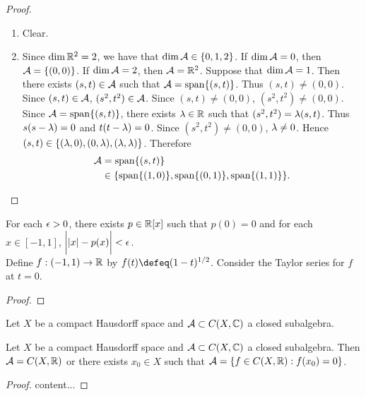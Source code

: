 \documentclass{book}
\begin{document}
\begin{proof}\
	\begin{enumerate}
		\item Clear.
		\item Since $\dim \mathbb{R}^2 = 2$, we have that $\dim \mathcal{A} \in \{0, 1, 2\}$. If $\dim \mathcal{A} = 0$, then $\mathcal{A} = \{(0,0)\}$. If $\dim \mathcal{A} = 2$, then $\mathcal{A} = \mathbb{R}^2$. Suppose that $\dim \mathcal{A} = 1$. Then there exists $(s,t) \in \mathcal{A}$ such that $\mathcal{A} = \operatorname{span} \{(s,t)\}$. Thus $(s,t) \neq (0,0)$. Since $(s,t) \in \mathcal{A}$, $(s^2, t^2) \in \mathcal{A}$. Since $(s,t) \neq (0,0)$, $(s^2, t^2) \neq (0,0)$. Since $\mathcal{A} = \operatorname{span} \{(s,t)\}$, there exists $\lambda \in \mathbb{R}$ such that $(s^2, t^2) = \lambda (s,t)$. Thus $s(s - \lambda) = 0$ and $t(t - \lambda) = 0$. Since $(s^2, t^2) \neq (0,0)$, $\lambda \neq 0$. Hence $(s,t) \in \{(\lambda, 0), (0, \lambda), (\lambda, \lambda)\}$. Therefore 
		\begin{align*}
			\mathcal{A}
			& = \operatorname{span} \{(s,t)\} \\
			& \in \{\operatorname{span} \{(1,0)\}, \operatorname{span} \{(0, 1)\}, \operatorname{span} \{(1,1)\} \}.
		\end{align*}
	\end{enumerate}
\end{proof}

\begin{ex}
	For each $\epsilon > 0$, there exists $p \in \mathbb{R}[x]$ such that $p(0) = 0$ and for each $x \in [-1,1]$, $\bigg| |x| - p(x) \bigg| < \epsilon$. \\ 
	\tbf{Hint:} Define $f:(-1,1) \rightarrow \mathbb{R}$ by $f(t) \defeq (1 - t)^{1/2}$. Consider the Taylor series for $f$ at $t = 0$.  
\end{ex}

\begin{proof}
\end{proof}

\begin{ex}
	Let $X$ be a compact Hausdorff space and $\mathcal{A} \subset C(X, \mathbb{C})$ a closed subalgebra.
\end{ex}


\begin{ex} 
	Let $X$ be a compact Hausdorff space and $\mathcal{A} \subset C(X, \mathbb{C})$ a closed subalgebra. Then $\mathcal{A} = C(X, \mathbb{R})$ or there exists $x_0 \in X$ such that $\mathcal{A} = \{f \in C(X, \mathbb{R}): f(x_0) = 0\}$.
\end{ex}

\begin{proof}
	content...
\end{proof}

	
\end{document}
